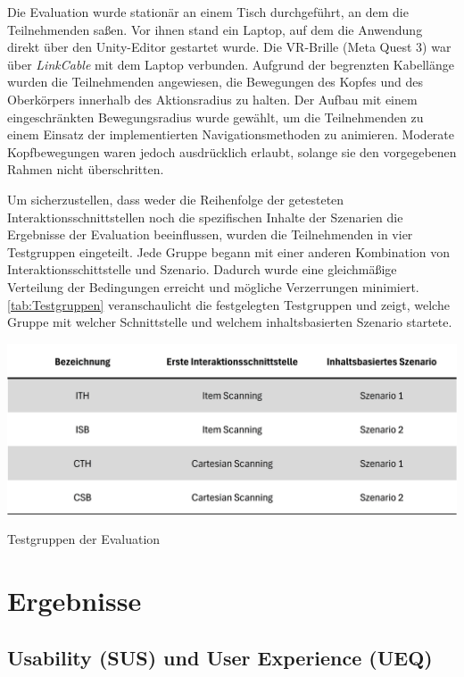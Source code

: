 Die Evaluation wurde stationär an einem Tisch durchgeführt, an dem die Teilnehmenden saßen. Vor ihnen stand ein Laptop, auf dem die Anwendung direkt über den Unity-Editor gestartet wurde. Die VR-Brille (Meta Quest 3) war über \textit{LinkCable} mit dem Laptop verbunden. Aufgrund der begrenzten Kabellänge wurden die Teilnehmenden angewiesen, die Bewegungen des Kopfes und des Oberkörpers innerhalb des Aktionsradius zu halten. Der Aufbau mit einem eingeschränkten Bewegungsradius wurde gewählt, um die Teilnehmenden zu einem Einsatz der implementierten Navigationsmethoden zu animieren. Moderate Kopfbewegungen waren jedoch ausdrücklich erlaubt, solange sie den vorgegebenen Rahmen nicht überschritten.

Um sicherzustellen, dass weder die Reihenfolge der getesteten Interaktionsschnittstellen noch die spezifischen Inhalte der Szenarien die Ergebnisse der Evaluation beeinflussen, wurden die Teilnehmenden in vier Testgruppen eingeteilt. Jede Gruppe begann mit einer anderen Kombination von Interaktionsschittstelle und Szenario. Dadurch wurde eine gleichmäßige Verteilung der Bedingungen erreicht und mögliche Verzerrungen minimiert. \autoref{tab:Testgruppen} veranschaulicht die festgelegten Testgruppen und zeigt, welche Gruppe mit welcher Schnittstelle und welchem inhaltsbasierten Szenario startete. 

\begin{table}
    \centering
    \includegraphics[scale=0.9]{images/Tabelle-Evaluationsgruppen.png}
    \caption{Testgruppen der Evaluation}
    \label{tab:Testgruppen}
\end{table}

\section{Ergebnisse}

\subsection{Usability (SUS) und User Experience (UEQ)}

